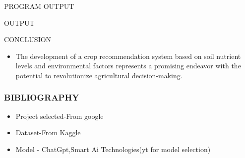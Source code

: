 \documentclass{beamer}
\begin{document}
\begin{frame}{PROGRAM OUTPUT}
 
 {}
 \end{frame}

\begin{frame}{OUTPUT}

{}
\end{frame}

\begin{frame}{CONCLUSION}
\begin{itemize}
    \item The development of a crop recommendation system based on soil nutrient levels and environmental factors represents a promising endeavor with the potential to revolutionize agricultural decision-making.
\end{itemize}
\end{frame}

\begin{frame}
\frametitle{\LARGE BIBLIOGRAPHY}
  \begin{itemize}
    \item\Large Project selected-From google
    \item\Large Dataset-From Kaggle
    \item\Large Model - ChatGpt,Smart Ai Technologies(yt for model selection)
    
  \end{itemize}
\end{frame}
\end{document}
